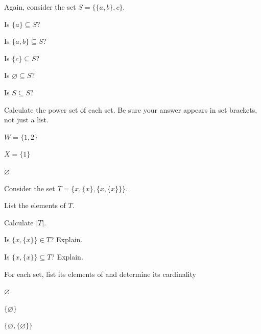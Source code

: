 \begin{exer}[\exerP] %
\label{exer_set_of_sets_subsets}
    Again, consider the set $S= \{\{a,b\},c\}$.
        \begin{exerpart}
            \item Is $\{a\} \subseteq S$? 
            \item Is $\{a,b\}\subseteq S$?
            \item Is $\{c\} \subseteq S$?
            \item Is $\varnothing  \subseteq S$?
            \item Is $S \subseteq S$?    
        \end{exerpart}
\end{exer}

\begin{exer}[\exerP] %
\label{exer_power_set} 
    Calculate the power set of each set.  Be sure your answer appears in set brackets, not just a list.
        \begin{exerpart}
            \item $W=\{1,2\}$
            \item $X= \{1\}$
            \item $\varnothing$
        \end{exerpart}
\end{exer}

\begin{exer}[\exerU] %
\label{exer_element_subset_or_both}  
    Consider the set $T=\{x, \{x\}, \{x,\{x\}\} \}$.
        \begin{exerpart}
            \item List the elements of $T$.
            \item Calculate $|T|$.
            \item Is $\{x,\{x\}\} \in T$?  Explain.
            \item Is $\{x,\{x\}\} \subseteq T$?  Explain.
        \end{exerpart}
\end{exer}

\begin{exer}[\exerU] %
\label{exer_set_of_sets_cardinality}
    For each set, list its elements of and determine its cardinality
        \begin{exerpart}
            \item $\varnothing$
            \item $\{ \varnothing\}$
            \item $\{ \varnothing, \{\varnothing\} \}$
        \end{exerpart}
\end{exer}

